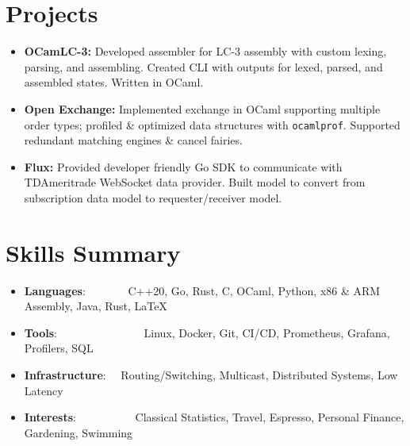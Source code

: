 \documentclass[a4paper,11pt]{extarticle}
\newcommand{\resumeSkillItem}[2]{
	\item\small{
		\textbf{#1}{: #2 \vspace{-2pt}}
	}
}
\newcommand{\resumeSubItem}[2]{\resumeSkillItem{#1}{#2}\vspace{-5pt}}
\newcommand{\resumeSubHeadingListStart}{
    \begin{itemize}[leftmargin=0.15in,label={}]}
\newcommand{\resumeSubHeadingListEnd}{\end{itemize}}
\begin{document}
\section{Projects}
    \noindent
    \begin{itemize}
        \vspace{-1.5mm}
        \item{\textbf{OCamLC-3:} Developed assembler for LC-3 assembly with
                custom lexing, parsing, and assembling. Created CLI with
                outputs for lexed, parsed, and assembled states. Written
                in OCaml.
        }
        \vspace{-1mm}
        \item{\textbf{Open Exchange:} Implemented exchange in OCaml
                supporting multiple order types; profiled \& optimized data
                structures with \texttt{ocamlprof}. Supported redundant
                matching engines \& cancel fairies.
        }
        \vspace{-1mm}
        \item{\textbf{Flux:} Provided developer friendly Go SDK to communicate
                with TDAmeritrade WebSocket data provider. Built model to
                convert from subscription data model to requester/receiver
                model. 
        }
    \end{itemize}

\section{Skills Summary}
	\resumeSubHeadingListStart
		\resumeSubItem{Languages}
            {\hspace{0.6mm}~~~~~~~C++20, Go, Rust, C, OCaml, Python, x86 \& ARM
                Assembly, Java, Rust, \LaTeX}
		\resumeSubItem{Tools}
            {\hspace{0.3mm}~~~~~~~~~~~~~~~Linux, Docker, Git, CI/CD, Prometheus,
            Grafana, Profilers, SQL}
		\resumeSubItem{Infrastructure}
            {~~Routing/Switching, Multicast, Distributed Systems, Low
            Latency}
        \resumeSubItem{Interests}
            {~~~~~~~~~~Classical Statistics, Travel, Espresso, Personal Finance,
            Gardening, Swimming}

        \begin{comment}
		\resumeSubItem{Finance}
			{\hspace{0.7mm}~~~~~~~~~~~Futures, Options, Stochastics, Hypothesis
				Testing, Commodities, Volatility}
        \end{comment}


	\resumeSubHeadingListEnd
\end{document}
